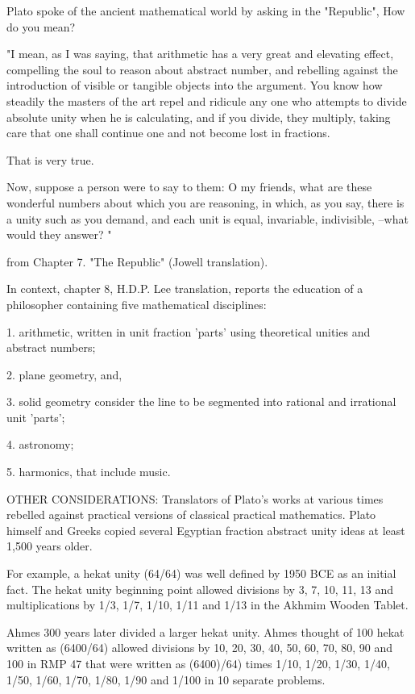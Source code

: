 \documentclass[12pt]{article}
\begin{document}
Plato spoke of the ancient mathematical world by asking in the "Republic", How do you mean?

"I mean, as I was saying, that arithmetic has a very great and elevating effect, compelling the soul to reason about abstract number, and rebelling against the introduction of visible or tangible objects into the argument. You know how steadily the masters of the art repel and ridicule any one who attempts to divide absolute unity when he is calculating, and if you divide, they multiply, taking care that one shall continue one and not become lost in fractions.

That is very true.

Now, suppose a person were to say to them: O my friends, what are these wonderful numbers about which you are reasoning, in which, as you say, there is a unity such as you demand, and each unit is equal, invariable, indivisible, --what would they answer? "

from Chapter 7. "The Republic" (Jowell translation).

In context, chapter 8, H.D.P. Lee translation, reports the education of a philosopher containing five mathematical disciplines:

1. arithmetic, written in unit fraction 'parts' using theoretical unities and abstract numbers;

2. plane geometry, and, 

3. solid geometry consider the line to be segmented into rational and irrational unit 'parts';

4. astronomy;

5. harmonics, that include music.

OTHER CONSIDERATIONS: Translators of Plato's works at various times rebelled against practical versions of classical practical mathematics. Plato himself and Greeks copied several Egyptian fraction abstract unity ideas at least 1,500 years older. 

For example, a hekat unity (64/64) was well defined by 1950 BCE as an initial fact. The hekat unity beginning point allowed divisions by 3, 7, 10, 11, 13  and multiplications by 1/3, 1/7, 1/10, 1/11 and 1/13 in the Akhmim Wooden Tablet. 

Ahmes 300 years later divided a larger hekat unity. Ahmes thought of 100 hekat written as (6400/64) allowed divisions by 10, 20, 30, 40, 50, 60, 70, 80, 90 and 100 in RMP 47 that were written as (6400)/64) times 1/10, 1/20, 1/30, 1/40, 1/50, 1/60, 1/70, 1/80, 1/90 and 1/100 in 10 separate problems. 
\end{document}
